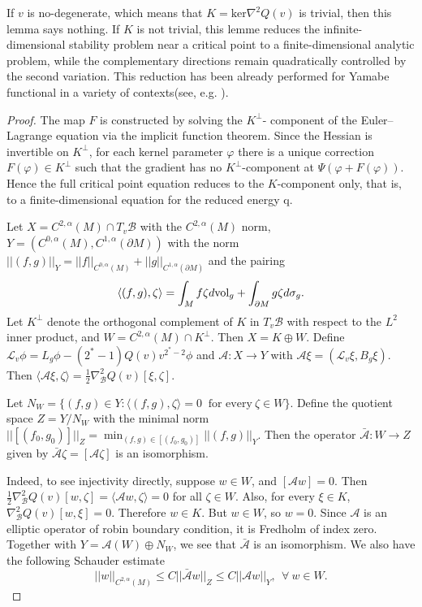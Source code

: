 \documentclass[12pt]{amsart}
\newcommand{\vphi}{\varphi}
\newcommand{\na}{{\nabla}}
\newcommand{\B}{\mathcal{B}}
\newcommand{\vol}{{\rm{vol}}}
\begin{document}
If $v$ is no-degenerate, which means that $K=\text{ker} \na^2 Q(v)$ is trivial, then this lemma says nothing. If $K$ is not trivial, this lemme reduces the infinite-dimensional stability problem near a critical point to a finite-dimensional analytic problem, while the complementary directions remain quadratically controlled by the second variation. This reduction has been already performed for Yamabe functional in a variety of contexts(see, e.g. \cite{CCR15} \cite{ENL22} \cite{Ha26}). 

\begin{proof}
    The map $F$ is constructed by solving the $K^\perp$- component of the Euler–Lagrange equation via the implicit function theorem. Since the Hessian is invertible on $K^\perp$, for each kernel parameter $\vphi$ there is a unique correction $F(\vphi) \in K^\perp$ such that the gradient has no $K^\perp$-component at $\Psi(\vphi +F(\vphi))$. Hence the full critical point equation reduces to the $K$-component only, that is, to a finite-dimensional equation for the reduced energy q.

   Let $X=C^{2,\alpha}(M) \cap T_v\B$ with the $C^{2,\alpha}(M)$ norm, $Y=\left( C^{0,\alpha}(M), C^{1,\alpha}(\partial M) \right)$ with the norm $||(f,g)||_Y = ||f||_{C^{0,\alpha}(M)}+||g||_{C^{1,\alpha}(\partial M)}$ and the pairing
   \begin{equation}
       \langle (f,g), \zeta \rangle = \int_M f \zeta d\vol_g + \int_{\partial M} g \zeta d\sigma_g.
   \end{equation}
   Let $K^\perp$ denote the orthogonal complement of $K$ in $T_v\B$ with respect to the $L^2$ inner product, and $W= C^{2,\alpha}(M) \cap K^\perp$. Then $X=K \oplus W$.
   Define $\mathcal{L}_v \phi = L_g \phi -(2^*-1)Q(v)v^{2^*-2} \phi $ and $\mathcal{A} : X \to Y$ with $\mathcal{A}\xi =(\mathcal{L}_v\xi, B_g\xi) $. Then $\langle \mathcal{A} \xi , \zeta\rangle = \frac{1}{2} \na_\B^2 Q(v)[\xi,\zeta]$.

   Let $N_{W} = \{(f,g) \in Y: \langle (f,g), \zeta \rangle =0 ~\text{  for every} ~\zeta \in W \} $. Define the quotient space $Z=Y/N_{W}$ with the minimal norm $||[(f_0,g_0)]||_Z= \min_{(f,g) \in [(f_0,g_0)]}||(f,g)||_Y$. Then the operator $\bar {\mathcal{A}} : W \to Z$ given by $\bar {\mathcal{A}} \zeta =[{\mathcal{A}}\zeta]$ is an isomorphism.

   Indeed, to see injectivity directly, suppose $w\in W$, and $[{\mathcal{A}}w]=0$. Then
   $\frac{1}{2} \na_\B^2 Q(v)[w,\zeta]=\langle \mathcal{A} w , \zeta\rangle =0$ for all $\zeta \in W$. Also, for every $\xi \in K$, $ \na_\B^2 Q(v)[w,\xi]=0$. Therefore $w \in K$. But $w\in W$, so $w=0$. Since $\mathcal{A}$ is an elliptic operator of robin boundary condition,  it is Fredholm of index zero. Together with $Y=\mathcal{A}(W) \oplus N_W$, we see that $\bar{\mathcal{A}}$ is an isomorphism. We also have the following Schauder estimate
   \begin{equation} \label{eq7}
       ||w||_{C^{2,\alpha}(M)} \leq C || \bar {\mathcal{A}} w||_Z \leq C||\mathcal{A} w||_Y,~~  \forall  ~w \in W.
   \end{equation}


\end{proof}
\end{document}
